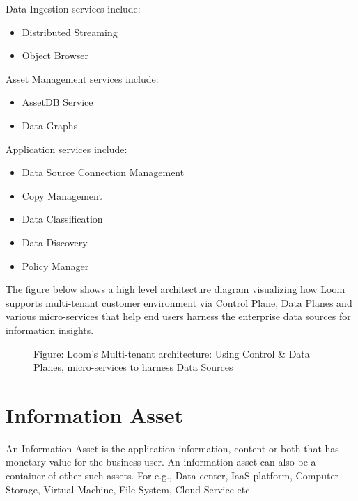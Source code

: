 \documentclass[letterpaper,10pt,english]{sphinxmanual}
\begin{document}
Data Ingestion services include:
\begin{itemize}
\item {} 
Distributed Streaming

\item {} 
Object Browser

\end{itemize}

Asset Management services include:
\begin{itemize}
\item {} 
AssetDB Service

\item {} 
Data Graphs

\end{itemize}

Application services include:
\begin{itemize}
\item {} 
Data Source Connection Management

\item {} 
Copy Management

\item {} 
Data Classification

\item {} 
Data Discovery

\item {} 
Policy Manager

\end{itemize}

The figure below shows a high level architecture diagram visualizing how Loom supports multi-tenant customer environment via Control Plane, Data Planes and various micro-services that help end users harness the enterprise data sources for information insights.

\begin{figure}[htbp]
\centering
\capstart

\noindent{}
\caption{Figure: Loom’s Multi-tenant architecture: Using Control \& Data Planes, micro-services to harness Data Sources}\label{\detokenize{mcdmp_concepts:cpt-planes-img}}\label{\detokenize{mcdmp_concepts:id7}}\end{figure}


\section{Information Asset}
\label{\detokenize{mcdmp_concepts:information-asset}}\label{\detokenize{mcdmp_concepts:term-info-asset}}
An Information Asset is the application information, content or both that has monetary value for the business user.  An information asset can also be a container of other such assets. For e.g., Data center, IaaS platform, Computer Storage, Virtual Machine, File-System, Cloud Service etc.
\end{document}
